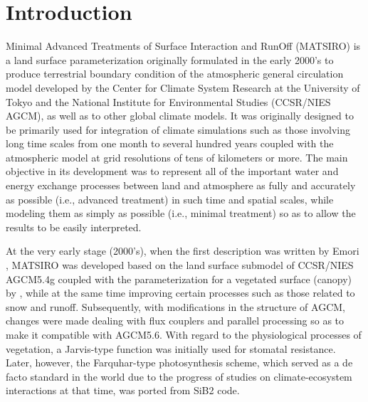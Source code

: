 \section{Introduction}\label{introduction}

Minimal Advanced Treatments of Surface Interaction and RunOff (MATSIRO) is a land surface parameterization originally formulated in the early 2000's \citep{Takata2003-xc} to produce terrestrial
boundary condition of the atmospheric general circulation model developed by the Center for Climate System Research at the University of Tokyo and the National Institute for Environmental Studies
(CCSR/NIES AGCM), as well as to other global climate models. It was originally designed to be primarily used for integration of climate simulations such as those involving long time scales from one
month to several hundred years coupled with the atmospheric model at grid resolutions of tens of kilometers or more. The main objective in its development was to represent all of the important water
and energy exchange processes between land and atmosphere as fully and accurately as possible (i.e., advanced treatment) in such time and spatial scales, while modeling them as simply as possible
(i.e., minimal treatment) so as to allow the results to be easily interpreted.

At the very early stage (2000's), when the first description was written by Emori \citep{Emori2001-qr}, MATSIRO was developed based on the land surface submodel of CCSR/NIES AGCM5.4g coupled with the
parameterization for a vegetated surface (canopy) by \citep{Watanabe1994-sx}, while at the same time improving certain processes such as those related to snow and runoff. Subsequently, with
modifications in the structure of AGCM, changes were made dealing with flux couplers and parallel processing so as to make it compatible with AGCM5.6. With regard to the physiological processes of
vegetation, a Jarvis-type function was initially used for stomatal resistance. Later, however, the Farquhar-type photosynthesis scheme, which served as a de facto standard in the world due to the
progress of studies on climate-ecosystem interactions at that time, was ported from SiB2 code.

